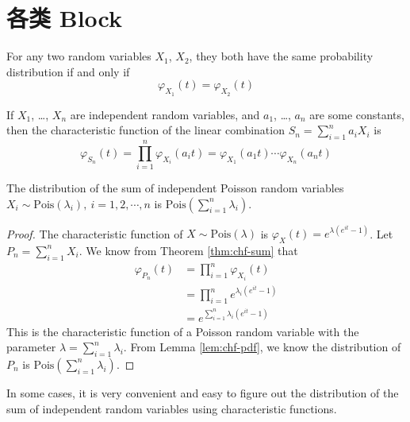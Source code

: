 \documentclass[
  cn,11pt,chinese,bibstyle=apalike]{elegantbook}
\let\BeginKnitrBlock\begin \let\EndKnitrBlock\end
\begin{document}
\hypertarget{block}{%
\section{各类 Block}\label{block}}

\BeginKnitrBlock{lemma}{}{}
\protect\hypertarget{lem:chf-pdf}{}{\label{lem:chf-pdf} }For any two random variables \(X_1\), \(X_2\), they both have the same probability distribution if and only if \[\varphi _{X_1}(t)=\varphi _{X_2}(t)\]
\EndKnitrBlock{lemma}

\BeginKnitrBlock{theorem}{}{}
\protect\hypertarget{thm:chf-sum}{}{\label{thm:chf-sum} }If \(X_1\), \ldots, \(X_n\) are independent random variables, and \(a_1\), \ldots, \(a_n\) are some constants, then the characteristic function of the linear combination \(S_n=\sum_{i=1}^na_iX_i\) is \[\varphi _{S_{n}}(t)=\prod_{i=1}^n\varphi _{X_i}(a_{i}t)=\varphi _{X_{1}}(a_{1}t)\cdots \varphi _{X_{n}}(a_{n}t)\]
\EndKnitrBlock{theorem}

\BeginKnitrBlock{proposition}{}{}
\protect\hypertarget{prp:unnamed-chunk-5}{}{\label{prp:unnamed-chunk-5} }The distribution of the sum of independent Poisson random variables \(X_i \sim \mathrm{Pois}(\lambda_i),\: i=1,2,\cdots,n\) is \(\mathrm{Pois}(\sum_{i=1}^n\lambda_i)\).
\EndKnitrBlock{proposition}

\BeginKnitrBlock{proof}
\iffalse{} {证明 } \fi{}The characteristic function of \(X\sim\mathrm{Pois}(\lambda)\) is \(\varphi _{X}(t)=e^{\lambda (e^{it}-1)}\). Let \(P_n=\sum_{i=1}^nX_i\). We know from Theorem \ref{thm:chf-sum} that \begin{equation*}
\begin{split}
\varphi _{P_{n}}(t) & =\prod_{i=1}^n\varphi _{X_i}(t) \\
& =\prod_{i=1}^n e^{\lambda_i (e^{it}-1)} \\
& = e^{\sum_{i=1}^n \lambda_i (e^{it}-1)}
\end{split}
\end{equation*} This is the characteristic function of a Poisson random variable with the parameter \(\lambda=\sum_{i=1}^n \lambda_i\). From Lemma \ref{lem:chf-pdf}, we know the distribution of \(P_n\) is \(\mathrm{Pois}(\sum_{i=1}^n\lambda_i)\).
\EndKnitrBlock{proof}

\BeginKnitrBlock{remark}
\iffalse{} {注 } \fi{}In some cases, it is very convenient and easy to figure out the distribution of the sum of independent random variables using characteristic functions.
\EndKnitrBlock{remark}
\end{document}
